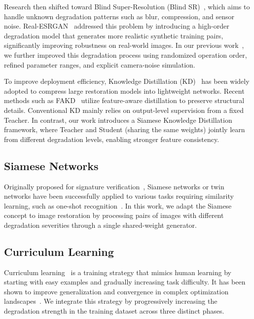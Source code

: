 \documentclass[conference]{IEEEtran}
\begin{document}
Research then shifted toward Blind Super-Resolution (Blind SR)~\cite{zhang2018learning,luo2020unfolding,gu2019blind}, which aims to handle unknown degradation patterns such as blur, compression, and sensor noise. Real-ESRGAN~\cite{wang2021realesrgan} addressed this problem by introducing a high-order degradation model that generates more realistic synthetic training pairs, significantly improving robustness on real-world images. In our previous work~\cite{11309534}, we further improved this degradation process using randomized operation order, refined parameter ranges, and explicit camera-noise simulation.

To improve deployment efficiency, Knowledge Distillation (KD)~\cite{hinton2015distilling,gao2018image} has been widely adopted to compress large restoration models into lightweight networks. Recent methods such as FAKD~\cite{he2020learning} utilize feature-aware distillation to preserve structural details. Conventional KD mainly relies on output-level supervision from a fixed Teacher. In contrast, our work introduces a Siamese Knowledge Distillation framework, where Teacher and Student (sharing the same weights) jointly learn from different degradation levels, enabling stronger feature consistency.

\subsection{Siamese Networks}
Originally proposed for signature verification~\cite{bromley1993signature}, Siamese networks or twin networks have been successfully applied to various tasks requiring similarity learning, such as one-shot recognition~\cite{koch2015siamese}. In this work, we adapt the Siamese concept to image restoration by processing pairs of images with different degradation severities through a single shared-weight generator.

\subsection{Curriculum Learning}
Curriculum learning~\cite{bengio2009curriculum} is a training strategy that mimics human learning by starting with easy examples and gradually increasing task difficulty. It has been shown to improve generalization and convergence in complex optimization landscapes~\cite{soviany2022curriculum}. We integrate this strategy by progressively increasing the degradation strength in the training dataset across three distinct phases.
\end{document}
